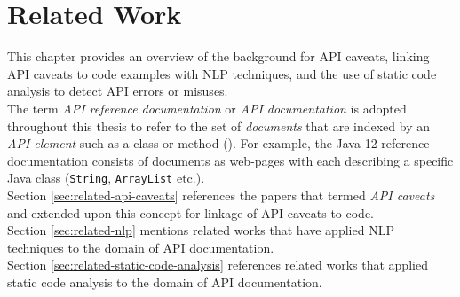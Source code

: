 \chapter{Related Work}
\label{cha:background}
This chapter provides an overview of the background for API caveats, linking API caveats to code examples with NLP techniques, and the use of static code analysis to detect API errors or misuses. \\
The term \textit{API reference documentation} or \textit{API documentation} is adopted throughout this thesis to refer to the set of \textit{documents} that are indexed by an \textit{API element} such as a class or method (\cite{maalej2013patterns}). For example, the Java 12 reference documentation consists of documents as web-pages with each describing a specific Java class (\lstinline{String}, \lstinline{ArrayList} etc.). \\

Section \ref{sec:related-api-caveats} references the papers that termed \textit{API caveats} and extended upon this concept for linkage of API caveats to code.\\

Section \ref{sec:related-nlp} mentions related works that have applied NLP techniques to the domain of API documentation.\\

Section \ref{sec:related-static-code-analysis} references related works that applied static code analysis to the domain of API documentation.\\

